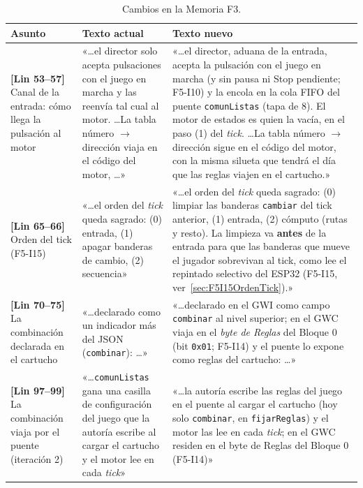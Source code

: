 \begin{table}[H]
	\centering
	\begin{tabularx}{\textwidth}{>{\RaggedRight\arraybackslash}p{3.6cm} >{\hsize=0.7\hsize\RaggedRight\arraybackslash}X >{\hsize=1.3\hsize\RaggedRight\arraybackslash}X}
		\toprule
		\textbf{Asunto} & \textbf{Texto actual} & \textbf{Texto nuevo} \\
		\midrule
		\textbf{[Lin 53--57]} Canal de la entrada: cómo llega la pulsación al motor &
		«\ldots el director solo acepta pulsaciones con el juego en
		marcha y las reenvía tal cual al motor. \ldots La tabla número
		$\rightarrow$ dirección viaja en el código del motor, \ldots» &
		«\ldots el director, aduana de la entrada, acepta la pulsación con
		el juego en marcha (y sin pausa ni Stop pendiente; F5-I10) y la
		encola en la cola FIFO del puente \texttt{comunListas} (tapa de
		8). El motor de estados es quien la vacía, en el paso (1) del
		\textit{tick}. \ldots La tabla número $\rightarrow$ dirección
		sigue en el código del motor, con la misma silueta que tendrá el
		día que las reglas viajen en el cartucho.» \\
		\midrule
		\textbf{[Lin 65--66]} Orden del tick (F5-I15) &
		«\ldots el orden del \textit{tick} queda sagrado: (0) entrada,
		(1) apagar banderas de cambio, (2) secuencia» &
		«\ldots el orden del \textit{tick} queda sagrado: (0) limpiar las
		banderas \texttt{cambiar} del tick anterior, (1) entrada,
		(2) cómputo (rutas y resto). La limpieza va \textbf{antes} de la
		entrada para que las banderas que mueve el jugador sobrevivan al
		tick, como lee el repintado selectivo del ESP32 (F5-I15,
		ver~\ref{sec:F5I15OrdenTick}).» \\
		\midrule
		\textbf{[Lin 70--75]} La combinación declarada en el cartucho &
		«\ldots declarado como un indicador más del JSON
		(\texttt{combinar}): \ldots» &
		«\ldots declarado en el GWI como campo \texttt{combinar} al nivel
		superior; en el GWC viaja en el \emph{byte de Reglas} del
		Bloque 0 (bit \texttt{0x01}; F5-I14) y el puente lo expone como
		reglas del cartucho: \ldots» \\
		\midrule
		\textbf{[Lin 97--99]} La combinación viaja por el puente (iteración 2) &
		«\ldots \texttt{comunListas} gana una casilla de configuración del
		juego que la autoría escribe al cargar el cartucho y el motor lee
		en cada \textit{tick}» &
		«\ldots la autoría escribe las reglas del juego en el puente al
		cargar el cartucho (hoy solo \texttt{combinar}, en
		\texttt{fijarReglas}) y el motor las lee en cada \textit{tick};
		en el GWC residen en el byte de Reglas del Bloque 0 (F5-I14)» \\
		\bottomrule
	\end{tabularx}
	\caption{Cambios en la Memoria F3.}
\end{table}

